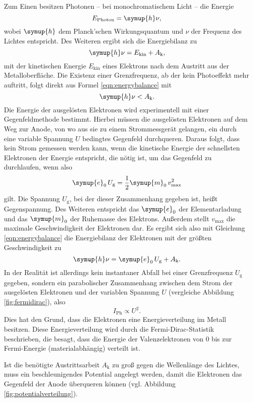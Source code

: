 Zum Einen besitzen Photonen -- bei monochromatischem Licht -- die Energie 
\begin{equation}
	E_{\mathrm{Photon}} = \symup{h} \nu \mathrm{,}
\end{equation}
wobei $\symup{h}$ dem Planck'schen Wirkungsquantum und $\nu$ der Frequenz des Lichtes 
entspricht. 
Des Weiteren ergibt sich die Energiebilanz zu
\begin{equation}
	\label{eqn:energybalance}
	\symup{h} \nu = E_{\mathrm{kin}} + A_{\mathrm{k}} \mathrm{,}
\end{equation}
mit der kinetischen Energie $E_{\mathrm{kin}}$ eines Elektrons nach dem Austritt aus der 
Metalloberfläche.
Die Existenz einer Grenzfrequenz, ab der kein Photoeffekt mehr auftritt, folgt direkt aus 
Formel \eqref{eqn:energybalance} mit
\begin{equation*}
	\symup{h} \nu < A_{\mathrm{k}} \mathrm{.}
\end{equation*}
Die Energie der ausgelösten Elektronen wird experimentell mit einer Gegenfeldmethode bestimmt.
Hierbei müssen die ausgelösten Elektronen auf dem Weg zur Anode, von wo aus sie zu einem 
Strommessgerät gelangen, ein durch eine variable Spannung $U$ bedingtes Gegenfeld
durchqueren. Daraus folgt, dass kein Strom gemessen werden kann, wenn die kinetische Energie 
der schnellsten Elektronen der Energie entspricht, die nötig ist, um das Gegenfeld zu 
durchlaufen, wenn also 
\begin{equation}
	\symup{e}_0 \, U_{\mathrm{g}} = \frac{1}{2} \symup{m}_0 \, v_{\mathrm{max}}^2
\end{equation}
gilt. Die Spannung $U_{\mathrm{g}}$, bei der dieser Zusammenhang gegeben ist, heißt
Gegenspannung. Des Weiteren entspricht das $\symup{e}_0$ der Elementarladung und das
$\symup{m}_0$ der Ruhemasse des Elektrons. Außerdem stellt $v_{\mathrm{max}}$ die maximale
Geschwindigkeit der Elektronen dar.
Es ergibt sich also mit Gleichung \eqref{eqn:energybalance} die Energiebilanz der Elektronen 
mit der größten Geschwindigkeit zu
\begin{equation}
	\label{eqn:gegenfeldelektron}
	\symup{h} \nu = \symup{e}_0 \, U_{\mathrm{g}} + A_{\mathrm{k}} \mathrm{.}
\end{equation}
In der Realität ist allerdings kein instantaner Abfall bei einer Grenzfrequenz $U_{\mathrm{g}}$
gegeben, sondern ein parabolischer Zusammenhang zwischen dem Strom der ausgelösten Elektronen 
und der variablen Spannung $U$ (vergleiche Abbildung \ref{fig:fermidirac}), also
\begin{equation*}
	I_{\mathrm{Ph}} \propto U^2 \mathrm{.}
\end{equation*}
Dies hat den Grund, dass die Elektronen eine Energieverteilung im Metall besitzen. Diese 
Energieverteilung wird durch die Fermi-Dirac-Statistik beschrieben, die besagt, dass die 
Energie der Valenzelektronen von 0 bis zur Fermi-Energie (materialabhängig) verteilt ist.

Ist die benötigte Austrittsarbeit $A_{\mathrm{k}}$ zu groß gegen die Wellenlänge des Lichtes,
muss ein beschleunigendes Potential angelegt werden, damit die Elektronen das Gegenfeld der 
Anode überqueren können (vgl. Abbildung \ref{fig:potentialverteilung}).
